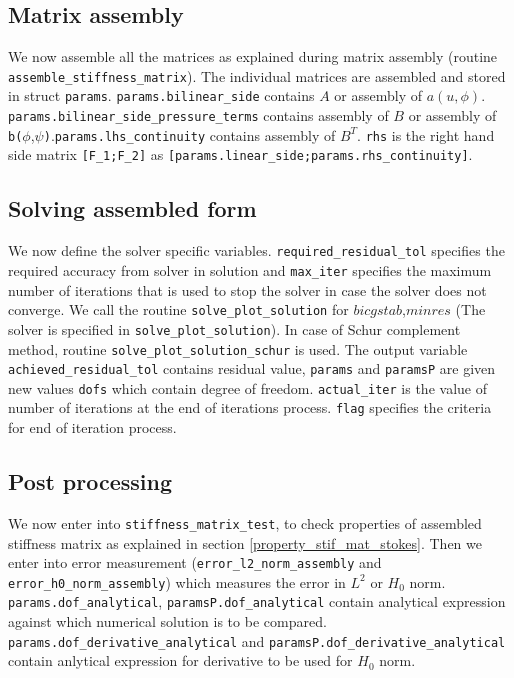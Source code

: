 \documentclass[a4paper]{book}
\begin{document}
\subsection{Matrix assembly}

We now assemble all the matrices as explained during matrix assembly (routine \verb|assemble_stiffness_matrix|). The individual matrices are assembled and stored in struct \verb|params|. \verb|params.bilinear_side| contains $A$ or assembly of $a(u,\phi)$. \verb|params.bilinear_side_pressure_terms| contains assembly of $B$ or assembly of \verb|b(|$\phi$,$\psi$\verb|)|.\verb|params.lhs_continuity| contains assembly of $B^T$. \verb|rhs| is the right hand side matrix \verb|[F_1;F_2]| as \verb|[params.linear_side;params.rhs_continuity]|. \\

\subsection{Solving assembled form}

We now define the solver specific variables. \verb|required_residual_tol| specifies the required accuracy from solver in solution and \verb|max_iter| specifies the maximum number of iterations that is used to stop the solver in case the solver does not converge. We call the routine \verb|solve_plot_solution| for $bicgstab$,$minres$ (The solver is specified in \verb|solve_plot_solution|). In case of Schur complement method, routine \verb|solve_plot_solution_schur| is used. The output variable \verb|achieved_residual_tol| contains residual value, \verb|params| and \verb|paramsP| are given new values \verb|dofs| which contain degree of freedom. \verb|actual_iter| is the value of number of iterations at the end of iterations process. \verb|flag| specifies the criteria for end of iteration process.\\

\subsection{Post processing}

We now enter into \verb|stiffness_matrix_test|, to check properties of assembled stiffness matrix as explained in section \ref{property_stif_mat_stokes}. Then we enter into error measurement (\verb|error_l2_norm_assembly| and \verb|error_h0_norm_assembly|) which measures the error in $L^2$ or $H_0$ norm. \verb|params.dof_analytical|, \verb|paramsP.dof_analytical| contain analytical expression against which numerical solution is to be compared. \verb|params.dof_derivative_analytical| and \verb|paramsP.dof_derivative_analytical| contain anlytical expression for derivative to be used for $H_0$ norm.\\
\end{document}
